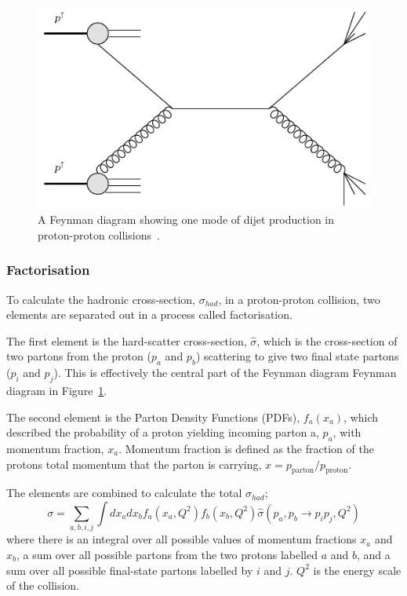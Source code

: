 \begin{figure}[!hbt]
  \begin{center}
    \includegraphics[width=0.7\linewidth, angle=0]{figs/Theory/qcd_dijet_feynman.png}
  \end{center}
  \caption[A Feynman diagram showing one mode of dijet production in proton-proton collisions.]
          {A Feynman diagram showing one mode of dijet production in proton-proton collisions~\cite{theo-qcd_dijet_feynman}.}
  \label{fig:theo-qcd_dijet_feynman}
\end{figure}

\subsubsection{Factorisation}

To calculate the hadronic cross-section, $\sigma_{had}$, in a proton-proton collision,
two elements are separated out in a process called factorisation.

The first element is the hard-scatter cross-section, $\hat{\sigma}$, which is the cross-section of
two partons from the proton ($p_a$ and $p_b$) scattering to give two final state partons ($p_i$ and $p_j$).
This is effectively the central part of the Feynman diagram Feynman diagram in Figure~\ref{fig:theo-qcd_dijet_feynman}.

The second element is the Parton Density Functions (PDFs), $f_a(x_a)$, which described the probability of
a proton yielding incoming parton a, $p_a$, with momentum fraction, $x_a$.
Momentum fraction is defined as the fraction of the protons total momentum that the parton is carrying, $x = p_{\text{parton}}/p_{\text{proton}}$.

The elements are combined to calculate the total $\sigma_{had}$;
\begin{equation}
  \sigma = \sum_{a,b,i,j} \int dx_a dx_b f_a(x_a,Q^2)f_b(x_b,Q^2) \hat{\sigma}(p_a, p_b\to p_i p_j,Q^2)
\end{equation}
where there is an integral over all possible values of momentum fractions $x_a$ and $x_b$,
a sum over all possible partons from the two protons labelled $a$ and $b$,
and a sum over all possible final-state partons labelled by $i$ and $j$.
$Q^2$ is the energy scale of the collision.

